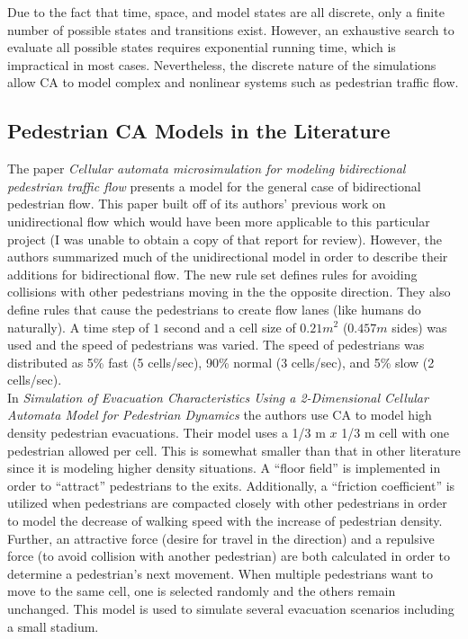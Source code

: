 \documentclass[paper=a4, fontsize=11pt]{scrartcl}
\numberwithin{equation}{section}		%
\numberwithin{figure}{section}			%
\numberwithin{table}{section}		    %
\begin{document}
	\noindent
	Due to the fact that time, space, and model states are all discrete, only a finite number of 
	possible states and transitions exist. However, an exhaustive search to evaluate all possible 
	states requires exponential running time, which is impractical in most cases. Nevertheless, the 
	discrete nature of the simulations allow CA to model complex and nonlinear systems such as 
	pedestrian traffic flow.\\
	
	\subsection{Pedestrian CA Models in the Literature}
	The paper \emph{Cellular automata microsimulation for modeling bidirectional pedestrian traffic 
	flow} \cite{blue2001cellular} presents a model for the general case of bidirectional pedestrian 
	flow. This paper built off of its authors' previous work on unidirectional flow which would 
	have been more applicable to this particular project (I was unable to obtain a copy of that 
	report for review). However, the authors summarized much of the unidirectional model in order 
	to describe their additions for bidirectional flow. The new rule set defines rules for avoiding 
	collisions with other pedestrians moving in the the opposite direction. They also define rules 
	that cause the pedestrians to create flow lanes (like humans do naturally). A time step of $1$ 
	second and a cell size of $0.21 m^2$ ($0.457 m$ sides) was used and the speed of pedestrians 
	was varied. The speed of pedestrians was distributed as 5\% fast (5 cells/sec), 90\% normal (3 
	cells/sec), and 5\% slow (2 cells/sec).\\
	
	\noindent
	In \emph{Simulation of Evacuation Characteristics Using a 2-Dimensional Cellular Automata Model 
	for Pedestrian Dynamics} \cite{ji2013simulation} the authors use CA to model high density 
	pedestrian evacuations. Their model uses a 1/3 m $x$ 1/3 m cell with one pedestrian allowed 
	per cell. This is somewhat smaller than that in other literature since it is modeling higher 
	density situations. A ``floor field'' is implemented in order to ``attract'' pedestrians to the 
	exits. Additionally, a ``friction coefficient'' is utilized when pedestrians are compacted 
	closely with other pedestrians in order to model the decrease of walking speed with the 
	increase of pedestrian density. Further, an attractive force (desire for travel in the 
	direction) and a repulsive force (to avoid collision with another pedestrian) are both 
	calculated in order to determine a pedestrian's next movement. When multiple pedestrians want 
	to move to the same cell, one is selected randomly and the others remain unchanged. This model 
	is used to simulate several evacuation scenarios including a small stadium.\\
	
\end{document}
